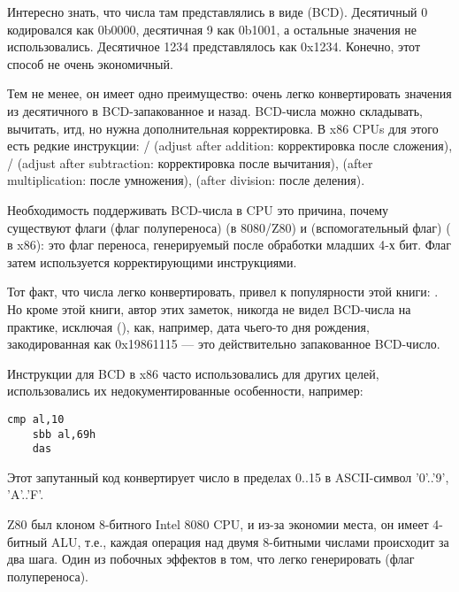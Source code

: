Интересно знать, что числа там представлялись в виде  (\ac{BCD}).
Десятичный 0 кодировался как 0b0000, десятичная 9 как 0b1001, а остальные значения не использовались.
Десятичное 1234 представлялось как 0x1234.
Конечно, этот способ не очень экономичный.

Тем не менее, он имеет одно преимущество: очень легко конвертировать значения из десятичного в \ac{BCD}-запакованное и назад.
BCD-числа можно складывать, вычитать, итд, но нужна дополнительная корректировка.
В x86 CPUs для этого есть редкие инструкции:
/ (adjust after addition: корректировка после сложения),
/ (adjust after subtraction: корректировка после вычитания),
 (after multiplication: после умножения),
 (after division: после деления).

Необходимость поддерживать \ac{BCD}-числа в CPU это причина, почему существуют флаги  (флаг полупереноса)
(в 8080/Z80) и
 (вспомогательный флаг) ( в x86):
это флаг переноса, генерируемый после обработки младших 4-х бит. Флаг затем используется корректирующими инструкциями.

Тот факт, что числа легко конвертировать, привел к популярности этой книги:
.
Но кроме этой книги, автор этих заметок, никогда не видел \ac{BCD}-числа на практике, исключая
 (),
как, например, дата чьего-то дня рождения, закодированная как 0x19861115 --- это действительно запакованное
\ac{BCD}-число.

Инструкции для \ac{BCD} в x86 часто использовались для других целей, использовались их недокументированные особенности,
например:

\begin{lstlisting}[style=customasmx86]
	cmp al,10
	sbb al,69h
	das
\end{lstlisting}

Этот запутанный код конвертирует число в пределах 0..15 в \ac{ASCII}-символ '0'..'9', 'A'..'F'.


Z80 был клоном 8-битного Intel 8080 CPU, и из-за экономии места, он имеет 4-битный \ac{ALU}, т.е., каждая
операция над двумя 8-битными числами происходит за два шага.
Один из побочных эффектов в том, что легко генерировать  (флаг полупереноса).

